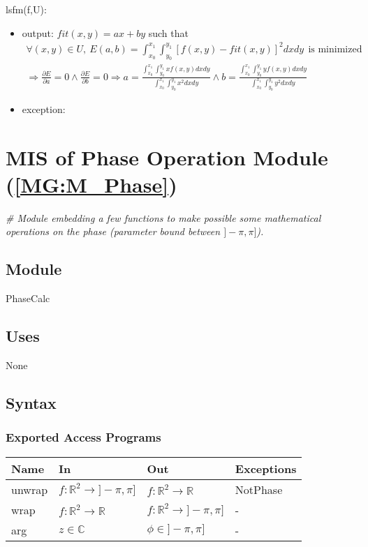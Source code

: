 \documentclass[12pt, titlepage]{article}
\begin{document}
\noindent lsfm(f,U):
\begin{itemize}
\item output: $fit(x,y)=ax + by$ such that
\begin{equation*}
\begin{gathered}
\forall (x,y) \in U, \ 
E(a,b)=\int_{x_0}^{x_1}\int_{y_0}^{y_1}[f(x,y)-fit(x,y)]^2dxdy \ \ \text{is 
minimized} \\
\Rightarrow \frac{\partial E}{\partial a} =0 \wedge \frac{\partial E}{\partial 
b} =0
\Rightarrow a = 
\frac{\int_{x_0}^{x_1}\int_{y_0}^{y_1}xf(x,y)dxdy}{\int_{x_0}^{x_1}\int_{y_0}^{y_1}x^2dxdy} 
\wedge  b= 
\frac{\int_{x_0}^{x_1}\int_{y_0}^{y_1}yf(x,y)dxdy}{\int_{x_0}^{x_1}\int_{y_0}^{y_1}y^2dxdy}
\end{gathered}
\end{equation*}
\item exception:
\end{itemize}


\section{MIS of Phase Operation Module (\texorpdfstring{\cref{MG:M_Phase}}))} 
\label{MIS_Phase}

\noindent\textit{{\#} Module embedding a few functions to make possible some 
mathematical operations on the phase (parameter bound between $]-\pi,\pi]$).} 
\medskip

\subsection{Module}
PhaseCalc
\subsection{Uses}
None
\subsection{Syntax}

\subsubsection{Exported Access Programs}

\begin{center}
\begin{tabular}{p{2cm} p{4cm} p{4cm} p{3cm}}
\hline
\textbf{Name} & \textbf{In} & \textbf{Out} & \textbf{Exceptions} \\
\hline
unwrap & $f:\mathbb{R}^2\rightarrow]-\pi,\pi]$ & 
$f:\mathbb{R}^2\rightarrow\mathbb{R}$ & NotPhase  \\
wrap & $f:\mathbb{R}^2\rightarrow\mathbb{R}$ & 
$f:\mathbb{R}^2\rightarrow]-\pi,\pi]$ & - \\
arg & $z \in \mathbb{C}$ & $\phi \in ]-\pi,\pi]$ &  - \\
\hline
\end{tabular}
\end{center}
\end{document}
